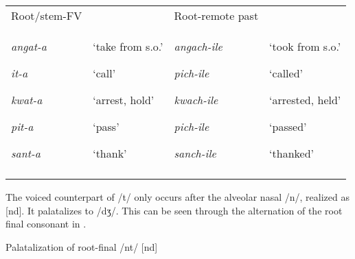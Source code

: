 \documentclass[output=paper]{langsci/langscibook}
\begin{document}
\begin{tabular}{llll}
\lsptoprule
\mdseries Root/stem-FV &  & \mdseries Root-remote past & \\
{\mdseries \emph{angat-a}}

{\mdseries \emph{it-a}}

{\mdseries \emph{kwat-a}}

{\mdseries \emph{pit-a}}

\mdseries \emph{sant-a} & {\mdseries ‘take from s.o.’}

{\mdseries ‘call’}

{\mdseries ‘arrest, hold’}

{\mdseries ‘pass’}

\mdseries ‘thank’ & {\mdseries \emph{angach-ile}}

{\mdseries \emph{pich-ile}}

{\mdseries \emph{kwach-ile}}

{\mdseries \emph{pich-ile }}

\mdseries \emph{sanch-ile} & {\mdseries ‘took from s.o.’}

{\mdseries ‘called’}

{\mdseries ‘arrested, held’}

{\mdseries ‘passed’}

\mdseries ‘thanked’\\
\lspbottomrule
\end{tabular}
The voiced counterpart of /t/ only occurs after the alveolar nasal /n/, realized as [nd]. It palatalizes to /dʒ/. This can be seen through the alternation of the root final consonant in .

\begin{stylelsTableHeading}%
\begin{table}
\caption{Palatalization of root-final /nt/ [nd]}
\label{tab:11}
\end{table}\end{stylelsTableHeading}
\end{document}
